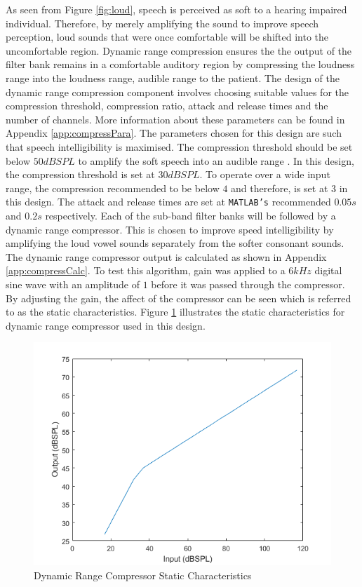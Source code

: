 \documentclass[11pt,onecolumn]{witseiepaper}
\begin{document}
\noindent As seen from Figure \ref{fig:loud}, speech is perceived as soft to a hearing impaired individual. Therefore, by merely amplifying the sound to improve speech perception, loud sounds that were once comfortable will be shifted into the uncomfortable region. Dynamic range compression ensures the the output of the filter bank remains in a comfortable auditory region by compressing the loudness range into the loudness range, audible range to the patient. The design of the dynamic range compression component involves choosing suitable values for the compression threshold, compression ratio, attack and release times and the number of channels. More information about these parameters can be found in Appendix \ref{app:compressPara}. The parameters chosen for this design are such that speech intelligibility is maximised. The compression threshold should be set below $50dBSPL$ to amplify the soft speech into an audible range \cite{compressHand}. In this design, the compression threshold is set at $30dBSPL$. To operate over a wide input range, the compression recommended to be below $4$ and therefore, is set at $3$ in this design. The attack and release times are set at \texttt{MATLAB's} recommended $0.05s$ and $0.2s$ respectively. Each of the sub-band filter banks will be followed by a dynamic range compressor. This is chosen to improve speed intelligibility by amplifying the loud vowel sounds separately from the softer consonant sounds. The dynamic range compressor output is calculated as shown in Appendix \ref{app:compressCalc}. To test this algorithm, gain was applied to a $6kHz$ digital sine wave with an amplitude of $1$ before it was passed through the compressor. By adjusting the gain, the affect of the compressor can be seen which is referred to as the static characteristics. Figure \ref{fig:staticChar} illustrates the static characteristics for dynamic range compressor used in this design.

\begin{figure}[h]
\centering
\includegraphics[width=0.6\linewidth]{staticChar.PNG}
\caption{Dynamic Range Compressor Static Characteristics}
\label{fig:staticChar}
\end{figure}
\end{document}

